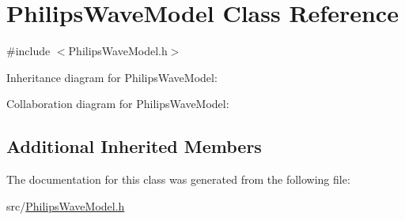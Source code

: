 \hypertarget{class_philips_wave_model}{}\section{Philips\+Wave\+Model Class Reference}
\label{class_philips_wave_model}


{\ttfamily \#include $<$Philips\+Wave\+Model.\+h$>$}



Inheritance diagram for Philips\+Wave\+Model\+:


Collaboration diagram for Philips\+Wave\+Model\+:
\subsection*{Additional Inherited Members}


The documentation for this class was generated from the following file\+:\begin{DoxyCompactItemize}
\item 
src/\hyperlink{_philips_wave_model_8h}{Philips\+Wave\+Model.\+h}\end{DoxyCompactItemize}
